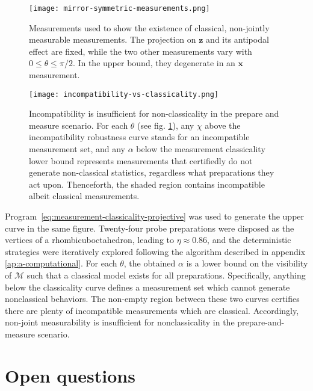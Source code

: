             \begin{figure}
                \centering
                \texttt{[image: mirror-symmetric-measurements.png]}
                \caption{Measurements used to show the existence of classical, non-jointly measurable measurements. The projection on $\mathbf{z}$ and its antipodal effect are fixed, while the two other measurements vary with $0 \leq \theta \leq \pi/2$. In the upper bound, they degenerate in an $\mathbf{x}$ measurement.}
            \label{fig:mirror-symmetric-measurements}
            \end{figure}
            \begin{figure}
                \centering
                \texttt{[image: incompatibility-vs-classicality.png]}
                \caption{Incompatibility is insufficient for non-classicality in the prepare and measure scenario. For each $\theta$ (see fig. \ref{fig:mirror-symmetric-measurements}), any $\chi$ above the incompatibility robustness curve stands for an incompatible measurement set, and any $\alpha$ below the measurement classicality lower bound represents measurements that certifiedly do not generate non-classical statistics, regardless what preparations they act upon. Thenceforth, the shaded region contains incompatible albeit classical measurements.}
            \label{fig:incompatibility-vs-classicality}
            \end{figure}

            Program~\eqref{eq:measurement-classicality-projective} was used to generate the upper curve in the same figure. Twenty-four probe preparations were disposed as the vertices of a rhombicuboctahedron, leading to $\eta \approx 0.86$, and the deterministic strategies were iteratively explored following the algorithm described in appendix \ref{ap:a-computational}. For each $\theta$, the obtained $\alpha$ is a lower bound on the visibility of $\mathcal{M}$ such that a classical model exists for all preparations. Specifically, anything below the classicality curve defines a measurement set which cannot generate nonclassical behaviors. The non-empty region between these two curves certifies there are plenty of incompatible measurements which are classical. Accordingly, non-joint measurability is insufficient for nonclassicality in the prepare-and-measure scenario.


        \section{Open questions}

